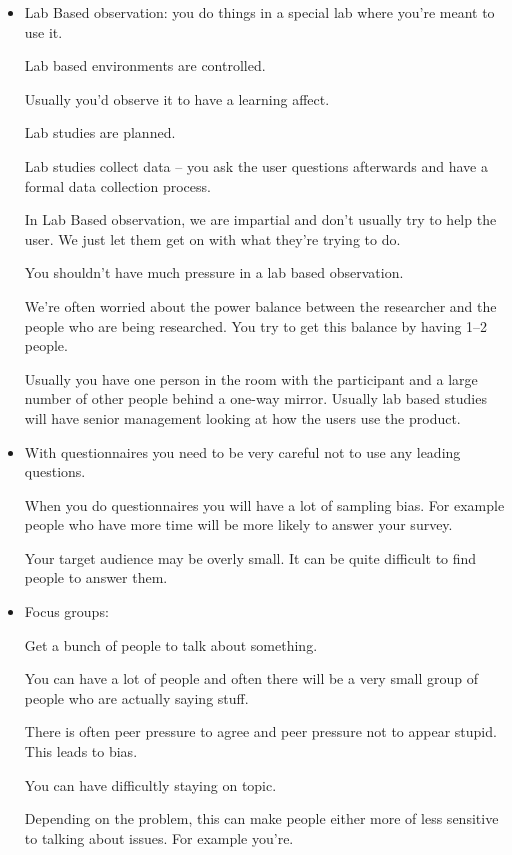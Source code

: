\documentclass[10pt, a4paper]{article}
\begin{document}
\begin{itemize}

\item

Lab Based observation: you do things in a special lab where you're meant to use it.

Lab based environments are controlled.

Usually you'd observe it to have a learning affect.

Lab studies are planned.

Lab studies collect data -- you ask the user questions afterwards and have a formal data collection process.

In Lab Based observation, we are impartial and don't usually try to help the user. We just let them get on with what
they're trying to do.

You shouldn't have much pressure in a lab based observation.

We're often worried about the power balance between the researcher and the people who are being researched. You try
to get this balance by having 1--2 people.

Usually you have one person in the room with the participant and a large number of other people behind a one-way
mirror. Usually lab based studies will have senior management looking at how the users use the product.

\item

With questionnaires you need to be very careful not to use any leading questions.

When you do questionnaires you will have a lot of sampling bias. For example people who have more time will be more
likely to answer your survey.

Your target audience may be overly small. It can be quite difficult to find people to answer them.

\item

Focus groups:

Get a bunch of people to talk about something.

You can have a lot of people and often there will be a very small group of people who are actually saying stuff.

There is often peer pressure to agree and peer pressure not to appear stupid. This leads to bias.

You can have difficultly staying on topic.

Depending on the problem, this can make people either more of less sensitive to talking about issues. For example
you're.


\end{itemize}
\end{document}
